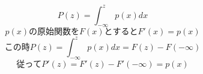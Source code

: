 $$P(z)=\int_{-\infty}^{z}{p(x)dx}$$
$$p(x)の原始関数をF(x)とするとF'(x)=p(x)$$
$$この時P(z)=\int_{-\infty}^{z}{p(x)dx}=F(z)-F(-\infty)$$
$$従ってP'(z)=F'(z)-F'(-\infty)=p(x)$$
